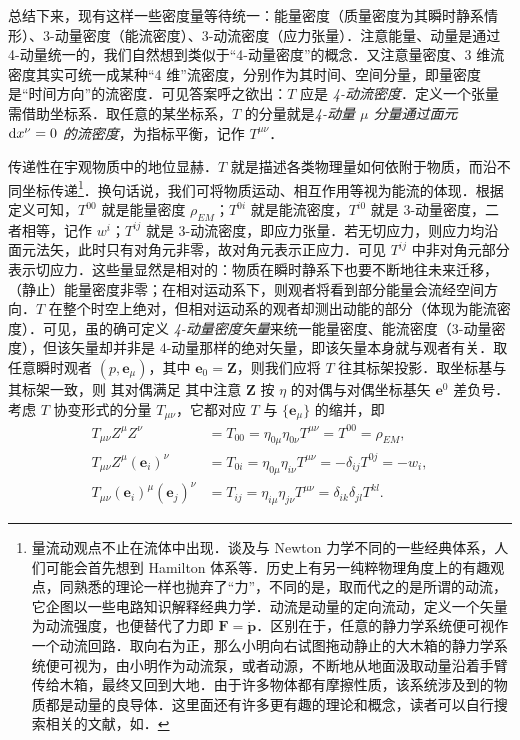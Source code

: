 总结下来，现有这样一些密度量等待统一：能量密度（质量密度为其瞬时静系情形）、3-动量密度（能流密度）、3-动流密度（应力张量）．注意能量、动量是通过 4-动量统一的，我们自然想到类似于“4-动量密度”的概念．又注意量密度、3 维流密度其实可统一成某种“4 维”流密度，分别作为其时间、空间分量，即量密度是“时间方向”的流密度．可见答案呼之欲出：$T$ 应是 \textit{4-动流密度}．定义一个张量需借助坐标系．取任意的某坐标系，$T$ 的分量就是\textit{4-动量 $\mu$ 分量通过面元 $\dd x^\nu=0$ 的流密度}，为指标平衡，记作 $T^{\mu\nu}$．








传递性在宇观物质中的地位显赫．$T$ 就是描述各类物理量如何依附于物质，而沿不同坐标传递\footnote{量流动观点不止在流体中出现．谈及与 Newton 力学不同的一些经典体系，人们可能会首先想到 Hamilton 体系等．历史上有另一纯粹物理角度上的有趣观点，同熟悉的理论一样也抛弃了“力”，不同的是，取而代之的是所谓的动流，它企图以一些电路知识解释经典力学．动流是动量的定向流动，定义一个矢量为动流强度，也便替代了力即 $\bm F=\dot{\bm p}$．区别在于，任意的静力学系统便可视作一个动流回路．取向右为正，那么小明向右试图拖动静止的大木箱的静力学系统便可视为，由小明作为动流泵，或者动源，不断地从地面汲取动量沿着手臂传给木箱，最终又回到大地．由于许多物体都有摩擦性质，该系统涉及到的物质都是动量的良导体．这里面还有许多更有趣的理论和概念，读者可以自行搜索相关的文献，如\cite{kpk}．}．换句话说，我们可将物质运动、相互作用等视为能流的体现．根据定义可知，$T^{00}$ 就是能量密度 $\rho_{EM}$；$T^{0i}$ 就是能流密度，$T^{i0}$ 就是 3-动量密度，二者相等，记作 $w^i$；$T^{ij}$ 就是 3-动流密度，即应力张量．若无切应力，则应力均沿面元法矢，此时只有对角元非零，故对角元表示正应力．可见 $T^{ij}$ 中非对角元部分表示切应力．这些量显然是相对的：物质在瞬时静系下也要不断地往未来迁移，（静止）能量密度非零；在相对运动系下，则观者将看到部分能量会流经空间方向．$T$ 在整个时空上绝对，但相对运动系的观者却测出动能的部分（体现为能流密度）．可见，虽的确可定义 \textit{4-动量密度矢量}来统一能量密度、能流密度（3-动量密度），但该矢量却并非是 4-动量那样的绝对矢量，即该矢量本身就与观者有关．取任意瞬时观者 $(p,\bm e_\mu)$，其中 $\bm e_0=\bm Z$，则我们应将 $T$ 往其标架投影．取坐标基与其标架一致，则
其对偶满足
其中注意 $\bm Z$ 按 $\eta$ 的对偶与对偶坐标基矢 $\bm e^0$ 差负号．考虑 $T$ 协变形式的分量 $T_{\mu\nu}$，它都对应 $T$ 与 $\{\bm e_\mu\}$ 的缩并，即
\begin{align}
    T_{\mu\nu}Z^\mu Z^\nu&=T_{00}=\eta_{0\mu}\eta_{0\nu}T^{\mu\nu}=T^{00}=\rho_{EM},\\ 
    T_{\mu\nu}Z^\mu(\bm e_i)^\nu&=T_{0i}=\eta_{0\mu}\eta_{i\nu}T^{\mu\nu}=-\delta_{ij}T^{0j}=-w_i,\\
    T_{\mu\nu}(\bm e_i)^\mu(\bm e_j)^\nu&=T_{ij}=\eta_{i\mu}\eta_{j\nu}T^{\mu\nu}=\delta_{ik}\delta_{jl}T^{kl}.
\end{align}
